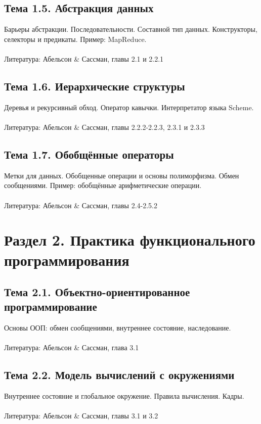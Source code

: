 \documentclass[a4paper,10pt]{article}
\begin{document}
\subsection*{Тема 1.5. Абстракция данных}
Барьеры абстракции. Последовательности. Составной тип данных. Конструкторы,
селекторы и предикаты. Пример: MapReduce.
\\\\
Литература: Абельсон \& Сассман, главы 2.1 и 2.2.1

\subsection*{Тема 1.6. Иерархические структуры}
Деревья и рекурсивный обход. Оператор кавычки. Интерпретатор языка Scheme.
\\\\
Литература: Абельсон \& Сассман, главы 2.2.2-2.2.3, 2.3.1 и 2.3.3

\subsection*{Тема 1.7. Обобщённые операторы}
Метки для данных. Обобщенные операции и основы полиморфизма. Обмен сообщениями.
Пример: обобщённые арифметические операции.
\\\\
Литература: Абельсон \& Сассман, главы 2.4-2.5.2

\section*{Раздел 2. Практика функционального программирования}

\subsection*{Тема 2.1. Объектно-ориентированное программирование}
Основы ООП: обмен сообщениями, внутреннее состояние, наследование.
\\\\
Литература: Абельсон \& Сассман, глава 3.1

\subsection*{Тема 2.2. Модель вычислений с окружениями}
Внутреннее состояние и глобальное окружение. Правила вычисления. Кадры.
\\\\
Литература: Абельсон \& Сассман, главы 3.1 и 3.2
\end{document}
